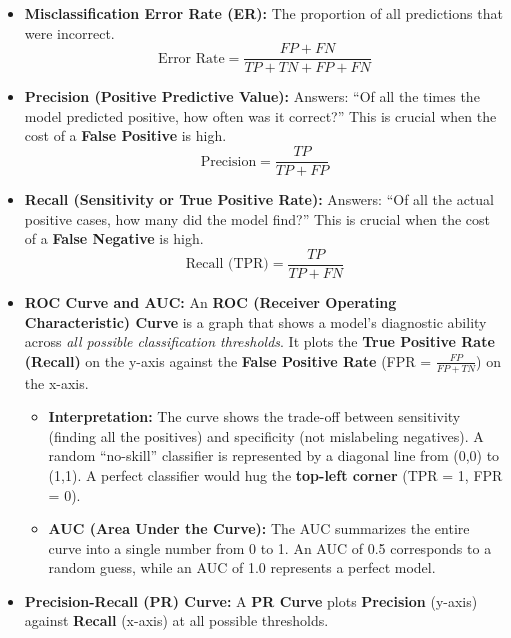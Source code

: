 \documentclass[
  letterpaper,
  DIV=11,
  numbers=noendperiod]{scrreprt}
\providecommand{\tightlist}{%
  \setlength{\itemsep}{0pt}\setlength{\parskip}{0pt}}\usepackage{longtable,booktabs,array}
\begin{document}
\begin{itemize}
\item
  \textbf{Misclassification Error Rate (ER):} The proportion of all
  predictions that were incorrect. \[
    \text{Error Rate} = \frac{FP + FN}{TP + TN + FP + FN}
    \]
\item
  \textbf{Precision (Positive Predictive Value):} Answers: ``Of all the
  times the model predicted positive, how often was it correct?'' This
  is crucial when the cost of a \textbf{False Positive} is high. \[
    \text{Precision} = \frac{TP}{TP + FP}
    \]
\item
  \textbf{Recall (Sensitivity or True Positive Rate):} Answers: ``Of all
  the actual positive cases, how many did the model find?'' This is
  crucial when the cost of a \textbf{False Negative} is high. \[
    \text{Recall (TPR)} = \frac{TP}{TP + FN}
    \]
\item
  \textbf{ROC Curve and AUC:} An \textbf{ROC (Receiver Operating
  Characteristic) Curve} is a graph that shows a model's diagnostic
  ability across \emph{all possible classification thresholds}. It plots
  the \textbf{True Positive Rate (Recall)} on the y-axis against the
  \textbf{False Positive Rate} (FPR = \(\frac{FP}{FP + TN}\)) on the
  x-axis.

  \begin{itemize}
  \tightlist
  \item
    \textbf{Interpretation:} The curve shows the trade-off between
    sensitivity (finding all the positives) and specificity (not
    mislabeling negatives). A random ``no-skill'' classifier is
    represented by a diagonal line from (0,0) to (1,1). A perfect
    classifier would hug the \textbf{top-left corner} (TPR = 1, FPR =
    0).
  \item
    \textbf{AUC (Area Under the Curve):} The AUC summarizes the entire
    curve into a single number from 0 to 1. An AUC of 0.5 corresponds to
    a random guess, while an AUC of 1.0 represents a perfect model.
  \end{itemize}
\item
  \textbf{Precision-Recall (PR) Curve:} A \textbf{PR Curve} plots
  \textbf{Precision} (y-axis) against \textbf{Recall} (x-axis) at all
  possible thresholds.


\end{itemize}
\end{document}
